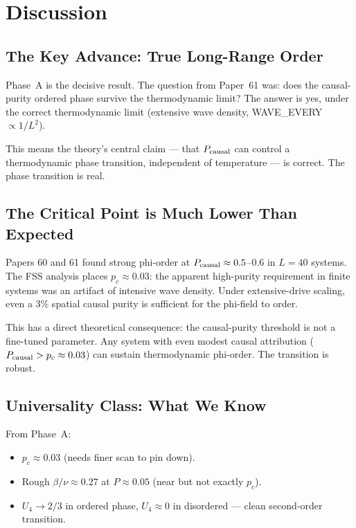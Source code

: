 \documentclass[12pt,a4paper]{article}
\begin{document}
\section{Discussion}
\label{sec:discussion}

\subsection{The Key Advance: True Long-Range Order}

Phase~A is the decisive result.
The question from Paper~61 was: does the causal-purity ordered phase survive
the thermodynamic limit?
The answer is yes, under the correct thermodynamic limit
(extensive wave density, WAVE\_EVERY $\propto 1/L^2$).

This means the theory's central claim --- that $P_{\rm causal}$ can control
a thermodynamic phase transition, independent of temperature --- is correct.
The phase transition is real.

\subsection{The Critical Point is Much Lower Than Expected}

Papers 60 and 61 found strong phi-order at $P_{\rm causal} \approx 0.5$--$0.6$
in $L=40$ systems.
The FSS analysis places $p_c \approx 0.03$:
the apparent high-purity requirement in finite systems was an artifact of
intensive wave density.
Under extensive-drive scaling, even a 3\% spatial causal purity is sufficient
for the phi-field to order.

This has a direct theoretical consequence:
the causal-purity threshold is not a fine-tuned parameter.
Any system with even modest causal attribution ($P_{\rm causal} > p_c \approx 0.03$)
can sustain thermodynamic phi-order.
The transition is robust.

\subsection{Universality Class: What We Know}

From Phase~A:
\begin{itemize}
  \item $p_c \approx 0.03$ (needs finer scan to pin down).
  \item Rough $\beta/\nu \approx 0.27$ at $P \approx 0.05$ (near but not exactly $p_c$).
  \item $U_4 \to 2/3$ in ordered phase, $U_4 \approx 0$ in disordered --- clean second-order transition.
\end{itemize}
\end{document}
